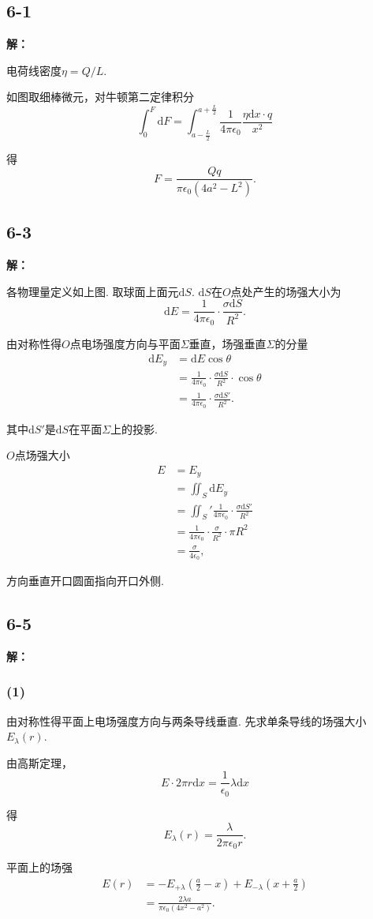 \documentclass[twocolumn]{ctexart}
\newcommand{\sol}[1]{\subsection*{#1}\noindent\textbf{解：}
	
}
\begin{document}
	\sol{6-1}
	
	电荷线密度$\eta=Q/L$.
	
	如图取细棒微元，对牛顿第二定律积分
	$$\int_{0}^{F}\mathrm{d}F=\int_{a-\frac{L}{2}}^{a+\frac{L}{2}}\frac{1}{4\pi\epsilon_0}\frac{\eta\mathrm{d}x\cdot q}{x^2}$$
	
	得
	$$F=\frac{Qq}{\pi\epsilon_0\left(4a^2-L^2\right)}.$$
	
	\sol{6-3}
	
	各物理量定义如上图. 取球面上面元$\mathrm{d}S$. $\mathrm{d}S$在$O$点处产生的场强大小为
	$$\mathrm{d}E=\frac{1}{4\pi\epsilon_0}\cdot\frac{\sigma\mathrm{d}S}{R^2}.$$
	
	由对称性得$O$点电场强度方向与平面$\Sigma$垂直，场强垂直$\Sigma$的分量
	\begin{align*}
		\mathrm{d}E_y&=\mathrm{d}E\cos\theta\\
		&=\frac{1}{4\pi\epsilon_0}\cdot\frac{\sigma\mathrm{d}S}{R^2}\cdot\cos\theta\\
		&=\frac{1}{4\pi\epsilon_0}\cdot\frac{\sigma\mathrm{d}S'}{R^2}.
	\end{align*}
	
	其中$\mathrm{d}S'$是$\mathrm{d}S$在平面$\Sigma$上的投影.
	
	$O$点场强大小
	\begin{align*}
		E&=E_y\\
		&=\iint_S\mathrm{d}E_y\\
		&=\iint_S'\frac{1}{4\pi\epsilon_0}\cdot\frac{\sigma\mathrm{d}S'}{R^2}\\
		&=\frac{1}{4\pi\epsilon_0}\cdot\frac{\sigma}{R^2}\cdot\pi R^2\\
		&=\frac{\sigma}{4\epsilon_0},
	\end{align*}
	
	方向垂直开口圆面指向开口外侧.
	
	\sol{6-5}
	\subsubsection*{(1)}
	由对称性得平面上电场强度方向与两条导线垂直. 先求单条导线的场强大小$E_\lambda(r)$.
	
	由高斯定理，
	$$E\cdot 2\pi r\mathrm{d}x=\frac{1}{\epsilon_0}\lambda\mathrm{d}x$$
	
	得
	$$E_\lambda(r)=\frac{\lambda}{2\pi\epsilon_0 r}.$$
	
	平面上的场强
	\begin{align*}
		E(r)&=-E_{+\lambda}(\frac{a}{2}-x)+E_{-\lambda}(x+\frac{a}{2})\\
		&=\frac{2\lambda a}{\pi\epsilon_0\left(4x^2-a^2\right)}.
	\end{align*}
	
\end{document}
